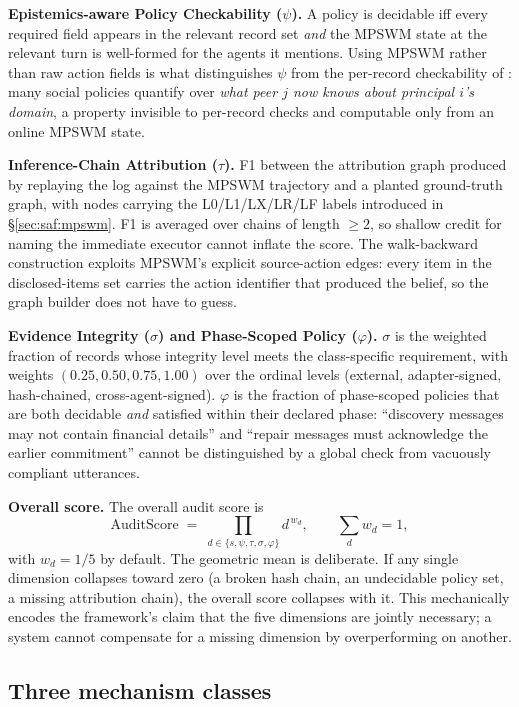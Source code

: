 \documentclass{article}
\begin{document}
\textbf{Epistemics-aware Policy Checkability ($\psi$).} A policy is decidable iff every required field appears in the relevant record set \emph{and} the MPSWM state at the relevant turn is well-formed for the agents it mentions. Using MPSWM rather than raw action fields is what distinguishes $\psi$ from the per-record checkability of \citet{nian2026auditable}: many social policies quantify over \emph{what peer $j$ now knows about principal $i$'s domain}, a property invisible to per-record checks and computable only from an online MPSWM state.

\textbf{Inference-Chain Attribution ($\tau$).} F1 between the attribution graph produced by replaying the log against the MPSWM trajectory and a planted ground-truth graph, with nodes carrying the L0/L1/LX/LR/LF labels introduced in \S\ref{sec:saf:mpswm}. F1 is averaged over chains of length $\geq 2$, so shallow credit for naming the immediate executor cannot inflate the score. The walk-backward construction exploits MPSWM's explicit source-action edges: every item in the disclosed-items set carries the action identifier that produced the belief, so the graph builder does not have to guess.

\textbf{Evidence Integrity ($\sigma$) and Phase-Scoped Policy ($\varphi$).} $\sigma$ is the weighted fraction of records whose integrity level meets the class-specific requirement, with weights $(0.25,0.50,0.75,1.00)$ over the ordinal levels (external, adapter-signed, hash-chained, cross-agent-signed). $\varphi$ is the fraction of phase-scoped policies that are both decidable \emph{and} satisfied within their declared phase: ``discovery messages may not contain financial details'' and ``repair messages must acknowledge the earlier commitment'' cannot be distinguished by a global check from vacuously compliant utterances.

\textbf{Overall score.} The overall audit score is
\[
  \mathrm{AuditScore} \;=\; \prod_{d \in \{s,\psi,\tau,\sigma,\varphi\}} d^{\,w_d},\qquad \sum_d w_d = 1,
\]
with $w_d = 1/5$ by default. The geometric mean is deliberate. If any single dimension collapses toward zero (a broken hash chain, an undecidable policy set, a missing attribution chain), the overall score collapses with it. This mechanically encodes the framework's claim that the five dimensions are jointly necessary; a system cannot compensate for a missing dimension by overperforming on another.

\subsection{Three mechanism classes}
\label{sec:saf:mech}
\end{document}
